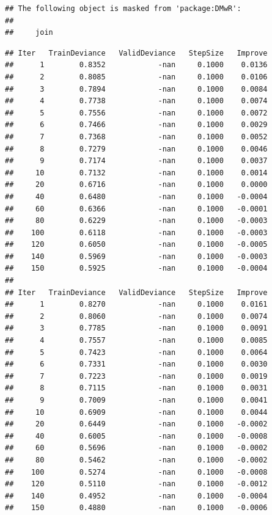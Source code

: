 \documentclass[]{book}
\begin{document}
\begin{verbatim}
## The following object is masked from 'package:DMwR':
## 
##     join
\end{verbatim}

\begin{verbatim}
## Iter   TrainDeviance   ValidDeviance   StepSize   Improve
##      1        0.8352            -nan     0.1000    0.0136
##      2        0.8085            -nan     0.1000    0.0106
##      3        0.7894            -nan     0.1000    0.0084
##      4        0.7738            -nan     0.1000    0.0074
##      5        0.7556            -nan     0.1000    0.0072
##      6        0.7466            -nan     0.1000    0.0029
##      7        0.7368            -nan     0.1000    0.0052
##      8        0.7279            -nan     0.1000    0.0046
##      9        0.7174            -nan     0.1000    0.0037
##     10        0.7132            -nan     0.1000    0.0014
##     20        0.6716            -nan     0.1000    0.0000
##     40        0.6480            -nan     0.1000   -0.0004
##     60        0.6366            -nan     0.1000   -0.0001
##     80        0.6229            -nan     0.1000   -0.0003
##    100        0.6118            -nan     0.1000   -0.0003
##    120        0.6050            -nan     0.1000   -0.0005
##    140        0.5969            -nan     0.1000   -0.0003
##    150        0.5925            -nan     0.1000   -0.0004
## 
## Iter   TrainDeviance   ValidDeviance   StepSize   Improve
##      1        0.8270            -nan     0.1000    0.0161
##      2        0.8060            -nan     0.1000    0.0074
##      3        0.7785            -nan     0.1000    0.0091
##      4        0.7557            -nan     0.1000    0.0085
##      5        0.7423            -nan     0.1000    0.0064
##      6        0.7331            -nan     0.1000    0.0030
##      7        0.7223            -nan     0.1000    0.0019
##      8        0.7115            -nan     0.1000    0.0031
##      9        0.7009            -nan     0.1000    0.0041
##     10        0.6909            -nan     0.1000    0.0044
##     20        0.6449            -nan     0.1000   -0.0002
##     40        0.6005            -nan     0.1000   -0.0008
##     60        0.5696            -nan     0.1000   -0.0002
##     80        0.5462            -nan     0.1000   -0.0002
##    100        0.5274            -nan     0.1000   -0.0008
##    120        0.5110            -nan     0.1000   -0.0012
##    140        0.4952            -nan     0.1000   -0.0004
##    150        0.4880            -nan     0.1000   -0.0006

\end{verbatim}
\end{document}
